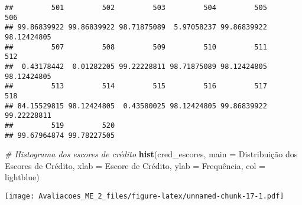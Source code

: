 \documentclass[
]{article}
\newenvironment{Shaded}{\begin{snugshade}}{\end{snugshade}}
\newcommand{\AttributeTok}[1]{\textcolor[rgb]{0.13,0.29,0.53}{#1}}
\newcommand{\CommentTok}[1]{\textcolor[rgb]{0.56,0.35,0.01}{\textit{#1}}}
\newcommand{\FunctionTok}[1]{\textcolor[rgb]{0.13,0.29,0.53}{\textbf{#1}}}
\newcommand{\NormalTok}[1]{#1}
\newcommand{\StringTok}[1]{\textcolor[rgb]{0.31,0.60,0.02}{#1}}
\begin{document}
\begin{verbatim}
##         501         502         503         504         505         506 
## 99.86839922 99.86839922 98.71875089  5.97058237 99.86839922 98.12424805 
##         507         508         509         510         511         512 
##  0.43178442  0.01282205 99.22228811 98.71875089 98.12424805 98.12424805 
##         513         514         515         516         517         518 
## 84.15529815 98.12424805  0.43580025 98.12424805 99.86839922 99.22228811 
##         519         520 
## 99.67964874 99.78227505
\end{verbatim}

\begin{Shaded}
\begin{Highlighting}[]
\CommentTok{\# Histograma dos escores de crédito}
\FunctionTok{hist}\NormalTok{(cred\_escores, }\AttributeTok{main =} \StringTok{\textquotesingle{}Distribuição dos Escores de Crédito\textquotesingle{}}\NormalTok{, }\AttributeTok{xlab =} \StringTok{\textquotesingle{}Escore de Crédito\textquotesingle{}}\NormalTok{, }\AttributeTok{ylab =} \StringTok{\textquotesingle{}Frequência\textquotesingle{}}\NormalTok{, }\AttributeTok{col =} \StringTok{\textquotesingle{}lightblue\textquotesingle{}}\NormalTok{)}
\end{Highlighting}
\end{Shaded}

\texttt{[image: Avaliacoes\_ME\_2\_files/figure-latex/unnamed-chunk-17-1.pdf]}
\end{document}
